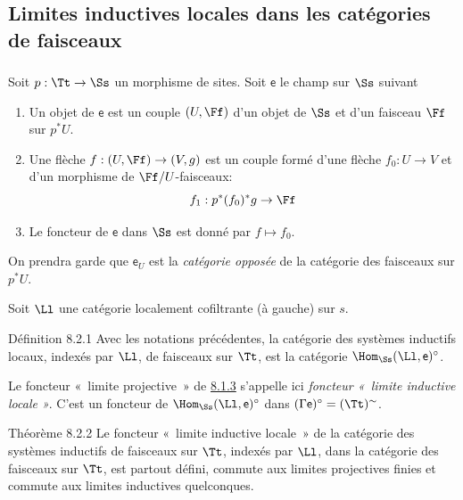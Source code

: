 \subsection{Limites inductives locales dans les catégories de
  faisceaux}

\setcounter{subsubsection}{-1}
\subsubsection{}

Soit $p : \Tt \to \Ss$ un morphisme de sites. Soit $\mathsf{e}$
le champ sur $\Ss$ suivant
\begin{enumerate}
\renewcommand{\theenumi}{\roman {enumi}}
\renewcommand{\labelenumi}{(\theenumi)}
\item Un objet de $\mathsf{e}$ est un couple $(U, \Ff)$ d'un
  objet de $\Ss$ et d'un faisceau $\Ff$ sur $p^{\ast}
  U$.

\item Une flèche $f : (U, \Ff) \to (V, g)$ est un couple formé
  d'une flèche $f_{0} : U \to V$ et d'un morphisme de
  $\Ff/U$-faisceaux:
$$
f_1 : p^{\ast} (f_0)^{\ast} g \to \Ff
$$

\item Le foncteur de $\mathsf{e}$ dans $\Ss$ est donné par $f \mapsto
  f_0$.
\end{enumerate}

On prendra garde que $\mathsf{e}_U$ est la \emph{catégorie opposée} de
  la catégorie des faisceaux sur $p^{\ast} U$.

Soit $\Ll$ une catégorie localement cofiltrante (à gauche) sur $s$.

\begin{enonce*}{Définition 8.2.1}
Avec les notations précédentes, la catégorie des systèmes inductifs
locaux, indexés par $\Ll$, de faisceaux sur $\Tt$, est la catégorie
$\Hom_{\Ss}(\Ll, \mathsf{e})^{\circ}$.
\end{enonce*}

Le foncteur « limite projective »  de \hyperref[V.def8.1.3]{8.1.3} s'appelle ici \emph{foncteur
« limite inductive locale »}. C'est un foncteur de
$\Hom_{\Ss}(\Ll, \mathsf{e})^{\circ}$ dans $(\Gamma
\mathsf{e})^{\circ} = (\Tt)^{\sim}$.

\begin{enonce*}{Théorème 8.2.2}
Le foncteur « limite inductive locale »  de la catégorie des
systèmes inductifs de faisceaux sur $\Tt$, indexés par
$\Ll$, dans la catégorie des faisceaux sur $\Tt$, est
partout défini, commute aux limites projectives finies et commute aux
limites inductives quelconques.
\end{enonce*}

